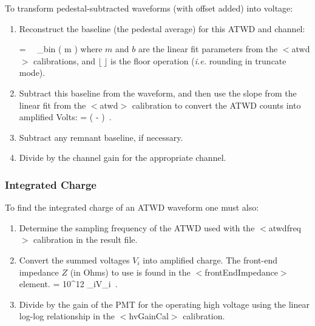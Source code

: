 \documentclass[10pt]{article}
\begin{document}
To transform pedestal-subtracted waveforms (with offset added) into voltage: 

\begin{enumerate}

\item{Reconstruct the baseline (the pedestal average) for this ATWD and
  channel:}

\be
{} = \lfloor\ \ \sum_{bin} \left( 
{m} \right) \rfloor
\ee
\noindent where $m$ and $b$ are the linear fit parameters from the
$<$atwd$>$ calibrations, and $\lfloor\ \rfloor$ is the floor operation
(\textit{i.e.} rounding in truncate mode).  

\item{Subtract this baseline from the waveform, and then use the slope from
  the linear fit from the $<$atwd$>$ calibration to convert
  the ATWD counts into amplified Volts:}
\be
{} =  \cdot 
( - )\ .
\ee

\item{Subtract any remnant baseline, if necessary.}

\item{Divide by the channel gain for the appropriate channel.} 

\end{enumerate}

\subsubsection{Integrated Charge}

To find the integrated charge of an ATWD waveform one must also:

\begin{enumerate}
\item{Determine the sampling frequency of the ATWD used with the
  $<$atwdfreq$>$ calibration in the result file.}
\item{Convert the summed voltages $V_i$ into amplified charge.  The
  front-end impedance $Z$ (in Ohms) to use is found in the $<$frontEndImpedance$>$
  element.}
\be
{} = 10^{12} \cdot {} \cdot
{} \cdot \sum_i{V_i}\ .
\ee
\item{Divide by the gain of the PMT for the operating high voltage using
  the linear log-log relationship in the $<$hvGainCal$>$ calibration.}
\end{enumerate}
\end{document}
